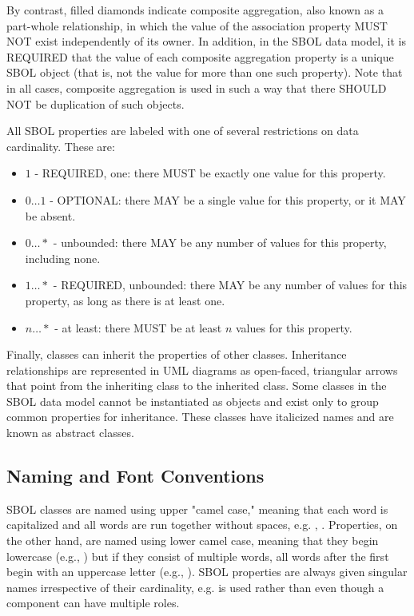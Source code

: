 By contrast, filled diamonds indicate composite aggregation, also known as a part-whole relationship, in which the value of the association property MUST NOT exist independently of its owner.
In addition, in the SBOL data model, it is REQUIRED that the value of each composite aggregation property is a unique SBOL object (that is, not the value for more than one such property).
Note that in all cases, composite aggregation is used in such a way that there SHOULD NOT be duplication of such objects.

All SBOL properties are labeled with one of several restrictions on data cardinality. These are:

\begin{itemize}

\item $1$ - REQUIRED, one: there MUST be exactly one value for this property.

\item $0 \ldots 1$ - OPTIONAL: there MAY be a single value for this property, or it MAY be absent.

\item $0 \ldots *$ - unbounded: there MAY be any number of values for this property, including none.

\item $1 \ldots *$ - REQUIRED, unbounded: there MAY be any number of values for this property, as long as there is at least one.

\item $n \ldots *$ - at least: there MUST be at least $n$ values for this property.

\end{itemize}

Finally, classes can inherit the properties of other classes. Inheritance relationships are represented in UML diagrams as open-faced, triangular arrows that point from the inheriting class to the inherited class. Some classes in the SBOL data model cannot be instantiated as objects and exist only to group common properties for inheritance. These classes have italicized names and are known as abstract classes.

\subsection{Naming and Font Conventions}
\label{sec:nameconventions}

SBOL classes are named using upper "camel case," meaning that each word is capitalized and all words are run together without spaces, e.g. , .
Properties, on the other hand, are named using lower camel case, meaning that they begin lowercase (e.g., ) but if they consist of multiple words, all words after the first begin with an uppercase letter (e.g., ). SBOL properties are always given singular names irrespective of their cardinality, e.g.  is used rather than  even though a component can have multiple roles.

